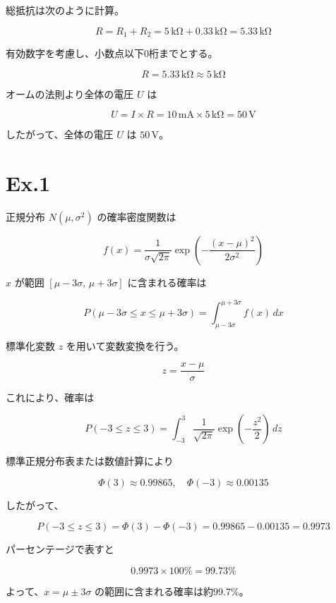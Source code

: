 \documentclass[a4paper,12pt]{article}
\begin{document}
総抵抗は次のように計算。

\[
R = R_1 + R_2 = 5\,\mathrm{k\Omega} + 0.33\,\mathrm{k\Omega} = 5.33\,\mathrm{k\Omega}
\]

有効数字を考慮し、小数点以下0桁までとする。

\[
R = 5.33\,\mathrm{k\Omega} \approx 5\,\mathrm{k\Omega}
\]

オームの法則より全体の電圧 $U$ は

\[
U = I \times R = 10\,\mathrm{mA} \times 5\,\mathrm{k\Omega} = 50\,\mathrm{V}
\]

したがって、全体の電圧 $U$ は $50\,\mathrm{V}$。

\section*{Ex.1}

正規分布 $N(\mu, \sigma^2)$ の確率密度関数は

\[
f(x) = \frac{1}{\sigma \sqrt{2\pi}} \exp\left( -\frac{(x - \mu)^2}{2\sigma^2} \right)
\]

$x$ が範囲 $[\mu - 3\sigma,\, \mu + 3\sigma]$ に含まれる確率は

\[
P(\mu - 3\sigma \leq x \leq \mu + 3\sigma) = \int_{\mu - 3\sigma}^{\mu + 3\sigma} f(x)\,dx
\]

標準化変数 $z$ を用いて変数変換を行う。

\[
z = \frac{x - \mu}{\sigma}
\]

これにより、確率は

\[
P(-3 \leq z \leq 3) = \int_{-3}^{3} \frac{1}{\sqrt{2\pi}} \exp\left( -\frac{z^2}{2} \right)\,dz
\]

標準正規分布表または数値計算により

\[
\Phi(3) \approx 0.99865,\quad \Phi(-3) \approx 0.00135
\]

したがって、

\[
P(-3 \leq z \leq 3) = \Phi(3) - \Phi(-3) = 0.99865 - 0.00135 = 0.9973
\]

パーセンテージで表すと

\[
0.9973 \times 100\% = 99.73\%
\]

よって、$x = \mu \pm 3\sigma$ の範囲に含まれる確率は約99.7\%。
\end{document}

